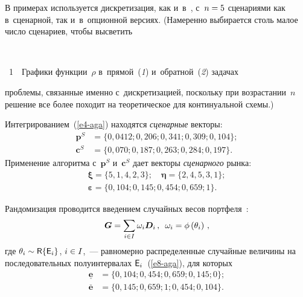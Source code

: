 \begin{multicols}{2}
  В примерах используется дискретизация, как и~в~\cite{4-aga}, с~$n\hm=5$ 
сценариями как в~сценарной, так
и~в~опционной версиях. (Намеренно 
выбирается столь малое число сценариев, чтобы высветить\linebreak\vspace*{-12pt}

  { \begin{center}  %
 \vspace*{18pt}
  \mbox{%
 \epsfxsize=79mm 
 }


\end{center}


\noindent
{{\figurename~1}\ \ \small{Графики функции~$\rho$ в~прямой~(\textit{1}) и~обратной~(\textit{2}) задачах}}
}


\addtocounter{figure}{1}

\noindent
  проблемы, 
связанные именно с~дискретизацией, поскольку при возрастании~$n$ решение 
все более походит на теоретическое для континуальной схемы.)




  Интегрированием~(\ref{e4-aga}) находятся \textit{сценарные} векторы: 
  \begin{align*}
  \boldsymbol{p}^S &= \{0{,}0412; 0{,}206; 0{,}341; 0{,}309; 0{,}104\};\\
  \boldsymbol{c}^S &= \{0{,}070; 0{,}187; 0{,}263; 0{,}284; 0{,}197\}.
  \end{align*}
    Применение алгоритма с~$\boldsymbol{p}^S$ и~$\boldsymbol{c}^S$ дает 
векторы \textit{сценарного} рынка: 
  \begin{gather*}
  \boldsymbol{\xi}  = \{5, 1, 4, 2, 3\};\quad \boldsymbol{\eta} = \{2, 4, 5, 3, 1\};\\
  \boldsymbol{\varepsilon} = \{0,{1}04; 0{,}145; 0{,}454; 0{,}659; 1\}.
  \end{gather*}
   
  Рандомизация проводится введением случайных весов  
портфеля~\cite{2-aga, 4-aga}:
  \begin{equation}
  \boldsymbol{G}=\sum\limits_{i\in I} \omega_i \boldsymbol{
    D}_i\,, \enskip \omega_i=\phi\left( \theta_i\right)\,,
   \label{e11-aga}
   \end{equation}
где $\theta_i\sim {\sf R}\{ {\sf E}_i\}$, $i\hm\in I$,~--- равномерно 
распределенные случайные величины на последовательных полуинтервалах 
${\sf E}_i$~(\ref{e8-aga}), для которых 
\begin{align*}
  \underline{\boldsymbol{e}} &= \{ 0{,}104; 0{,}454; 0{,}659; 0{,}145; 0\}; \\
  \overline{\boldsymbol{e}} &= \{0{,}145; 0{,}659; 1; 0{,}454; 0{,}104\}.
  \end{align*}
  

\end{multicols}
